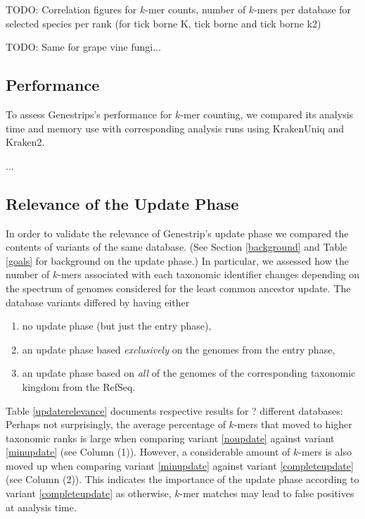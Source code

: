 \documentclass[letterpaper,11pt,leqno]{article}
\begin{document}
TODO: Correlation figures for $k$-mer counts, number of $k$-mers per database for selected species per rank (for tick borne K, tick borne and tick borne k2)

TODO: Same for grape vine fungi...

\subsection{Performance}

To assess Genestrips's performance for $k$-mer counting, we compared its analysis time and memory use with 
corresponding analysis runs using KrakenUniq and Kraken2.

...

\subsection{Relevance of the Update Phase}

In order to validate the relevance of Genestrip's update phase we compared the contents of variants of the same database. (See Section \ref{background} and Table \ref{goals} for background on the update phase.) In particular, we assessed how the number of $k$-mers associated with each taxonomic identifier changes depending on the spectrum of genomes considered for the least common ancestor update. The database variants differed by having either
\begin{enumerate}
	\item no update phase (but just the entry phase), \label{noupdate}
	\item an update phase based \emph{exclusively} on the genomes from the entry phase, \label{minupdate}
	\item an update phase based on \emph{all} of the genomes of the corresponding taxonomic kingdom from the RefSeq.\label{completeupdate} 
\end{enumerate}
Table \ref{updaterelevance} documents respective results for ? different databases: Perhaps not surprisingly, the average percentage of $k$-mers that moved to higher taxonomic ranks is large when comparing variant \ref{noupdate} against variant \ref{minupdate} (see Column (1)). However, a considerable amount of $k$-mers is also moved up when comparing variant \ref{minupdate} against variant \ref{completeupdate} (see Column (2)). This indicates the importance of the update phase according to variant \ref{completeupdate} as otherwise, $k$-mer matches may lead to false positives at analysis time.
\end{document}
